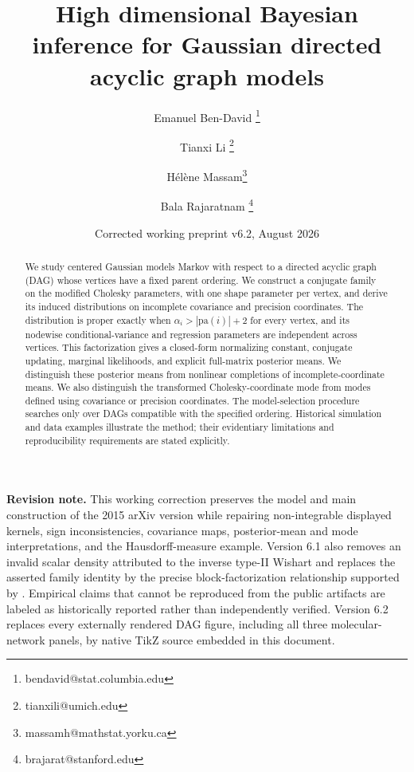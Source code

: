\documentclass[12pt]{article}
\title{High dimensional Bayesian inference for Gaussian directed acyclic graph models}
\author[1]{Emanuel Ben-David \thanks{bendavid@stat.columbia.edu}}
\author[2]{Tianxi Li \thanks{tianxili@umich.edu}}
\author[3]{H\'{e}l\`{e}ne Massam\thanks{massamh@mathstat.yorku.ca}}
\author[4]{Bala Rajaratnam \thanks{brajarat@stanford.edu}}
\affil[1]{Department of Statistics, Columbia University}
\affil[2]{Department of Statistics, University of Michigan}
\affil[3]{Department of Mathematics and Statistics, York University}
\affil[4]{Department of Statistics, Stanford University}
\date{Corrected working preprint v6.2, August 2026}
\theoremstyle{plain}
\theoremstyle{definition}
\theoremstyle{remark}
\begin{document}
\maketitle


\begin{abstract}
We study centered Gaussian models Markov with respect to a directed
acyclic graph (DAG) whose vertices have a fixed parent ordering.  We
construct a conjugate family on the modified Cholesky parameters, with
one shape parameter per vertex, and derive its induced distributions on
incomplete covariance and precision coordinates.  The distribution is
proper exactly when \(\alpha_i>|\mathrm{pa}(i)|+2\) for every vertex,
and its nodewise conditional-variance and regression parameters are
independent across vertices.  This factorization gives a closed-form
normalizing constant, conjugate updating, marginal likelihoods, and
explicit full-matrix posterior means.  We distinguish these posterior
means from nonlinear completions of incomplete-coordinate means.  We also
distinguish the transformed Cholesky-coordinate mode from modes defined
using covariance or precision coordinates.  The
model-selection procedure searches only over DAGs compatible with the
specified ordering.  Historical simulation and data examples
illustrate the method; their evidentiary limitations and reproducibility
requirements are stated explicitly.
\end{abstract}

\begin{center}
\begin{minipage}{0.92\textwidth}
\small\textbf{Revision note.}
This working correction preserves the model and main construction of the
2015 arXiv version while repairing non-integrable displayed kernels,
sign inconsistencies, covariance maps, posterior-mean and mode
interpretations, and the Hausdorff-measure example.  Version 6.1 also
removes an invalid scalar density attributed to the inverse type-II
Wishart and replaces the asserted family identity by the precise
block-factorization relationship supported by \cite{letac07*}.  Empirical
claims that cannot be reproduced from the public artifacts are labeled as
historically reported rather than independently verified.  Version 6.2
replaces every externally rendered DAG figure, including all three
molecular-network panels, by native TikZ source embedded in this document.
\end{minipage}
\end{center}


\end{document}
